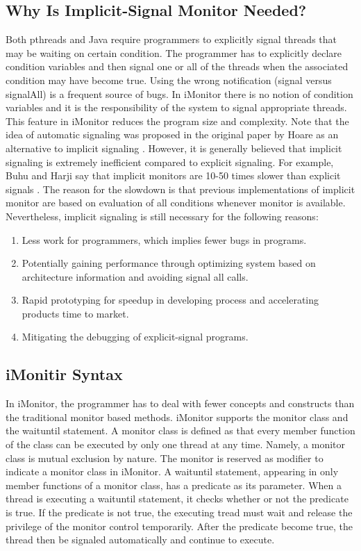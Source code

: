 \documentclass[preprint]{sigplanconf}
\begin{document}
\subsection{Why Is Implicit-Signal Monitor Needed?}
Both pthreads and Java require programmers to explicitly
signal threads that may be waiting on certain condition. The programmer
has to explicitly declare condition variables and then signal one
or all of the threads when the associated condition may have become true.
Using the wrong notification (signal versus signalAll) is a frequent
source of bugs. In iMonitor there is no notion of condition variables
and it is the responsibility of the system to signal appropriate threads.
This feature in iMonitor reduces the program size and complexity.
Note that the idea of automatic signaling was proposed 
in the original paper by Hoare as an alternative to implicit
signaling \cite{hoa74}. However, it is generally believed that implicit 
signaling is extremely inefficient compared to explicit signaling. 
For example, Buhu and Harji say that implicit monitors are 10-50 times
slower than explicit signals \cite{bfc95}. The reason for the slowdown is that
previous implementations of implicit monitor are based on 
evaluation of all conditions whenever monitor is available. 
Nevertheless, implicit signaling is still necessary for the following reasons:
\begin{enumerate}
    \item Less work for programmers, which implies fewer bugs in programs.
    \item Potentially gaining performance through optimizing system based on
        architecture information and avoiding signal all calls.
    \item Rapid prototyping for speedup in developing process and accelerating
        products time to market.
    \item Mitigating the debugging of explicit-signal programs. 
\end{enumerate}

\subsection{iMonitir Syntax}
In iMonitor, the programmer has to deal with fewer concepts 
and constructs than the traditional monitor based methods.
iMonitor supports the monitor class and the waituntil statement.
A monitor class is defined as that every member function of the class can be 
executed by only one thread at any time. Namely, a monitor class is mutual 
exclusion by nature. The monitor is reserved as modifier to indicate a monitor 
class in iMonitor. A waituntil statement, appearing in only member 
functions of a monitor class, has a predicate as its parameter. When a thread 
is executing a waituntil statement, it checks whether or not the predicate is 
true. If the predicate is not true, the executing tread must wait and release 
the privilege of the monitor control temporarily. After the predicate become 
true, the thread then be signaled automatically and continue to execute. 
\end{document}
